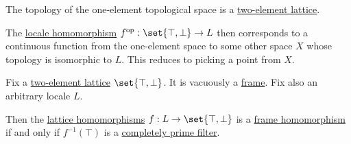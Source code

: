 \begin{remark}\label{rem:picking_a_point_from_a_locale}
  The topology of the one-element topological space is a \hyperref[thm:two_element_lattice]{two-element lattice}.

  The \hyperref[def:category_of_small_locales]{locale homomorphism} \( f^{\opcat}: \set{ \top, \bot } \to L \) then corresponds to a continuous function from the one-element space to some other space \( X \) whose topology is isomorphic to \( L \). This reduces to picking a point from \( X \).
\end{remark}

\begin{lemma}\label{thm:frame_homomorphism_kernel}
  Fix a \hyperref[thm:two_element_lattice]{two-element lattice} \( \set{ \top, \bot } \). It is vacuously a \hyperref[def:category_of_small_locales]{frame}. Fix also an arbitrary locale \( L \).

  Then the \hyperref[def:semilattice/homomorphism]{lattice homomorphisms} \( f: L \to \set{ \top, \bot } \) is a \hyperref[def:category_of_small_frames]{frame homomorphism} if and only if \( f^{-1}(\top) \) is a \hyperref[def:lattice_ideal/prime]{completely prime filter}.
\end{lemma}
